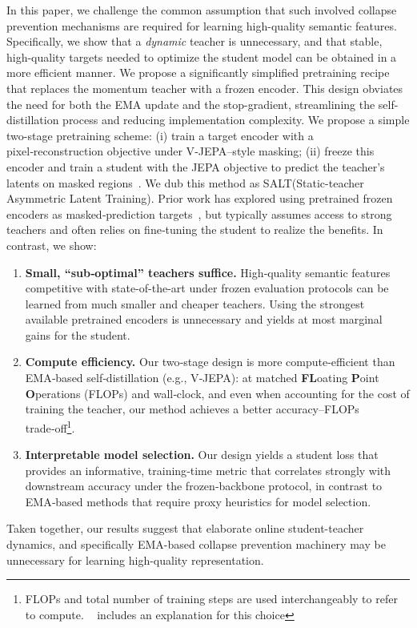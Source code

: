 \documentclass{applemlr}
\numberwithin{equation}{section}
\newcommand{\ourmethod}{SALT\xspace}
\begin{document}
In this paper, we challenge the common assumption that such involved collapse prevention mechanisms are required for learning high-quality semantic features. Specifically, we show that a \emph{dynamic} teacher is unnecessary, and that stable, high-quality targets needed to optimize the student model can be obtained in a more efficient manner. We propose a significantly simplified pretraining recipe that replaces the momentum teacher with a frozen encoder. This design obviates the need for both the EMA update and the stop-gradient, streamlining the self-distillation process and reducing implementation complexity. 
We propose a simple two-stage pretraining scheme: (i) train a target encoder with a pixel‑reconstruction objective under V‑JEPA–style masking; (ii) freeze this encoder and train a student with the JEPA objective to predict the teacher’s latents on masked regions~\citep{bardes2024vjepa}. We dub this method as \ourmethod (Static-teacher Asymmetric Latent Training). Prior work has explored using pretrained frozen encoders as masked‑prediction targets~\citep{mvd_wang2022, umt_li2023}, but typically assumes access to strong teachers and often relies on fine‑tuning the student to realize the benefits. In contrast, we show:
\begin{enumerate}
\item \textbf{Small, “sub‑optimal” teachers suffice.} High‑quality semantic features competitive with state-of-the-art under frozen evaluation protocols can be learned from much smaller and cheaper teachers. Using the strongest available pretrained encoders is unnecessary and yields at most marginal gains for the student.
\item \textbf{Compute efficiency.} Our two‑stage design is more compute‑efficient than EMA‑based self‑distillation (e.g., V‑JEPA): at matched \textbf{FL}oating \textbf{P}oint \textbf{O}perations (FLOPs) and wall‑clock, and even when accounting for the cost of training the teacher, our method achieves a better accuracy–FLOPs trade‑off\footnote{
FLOPs and total number of training steps are used interchangeably to refer to compute. ~ includes an explanation for this choice}. 

\item \textbf{Interpretable model selection.} Our design yields a student loss that provides an informative, training‑time metric that correlates strongly with downstream accuracy under the frozen‑backbone protocol, in contrast to EMA‑based methods that require proxy heuristics for model selection.
\end{enumerate}
Taken together, our results suggest that elaborate online student-teacher dynamics, and specifically EMA-based collapse prevention machinery may be unnecessary for learning high-quality representation.  
\end{document}
